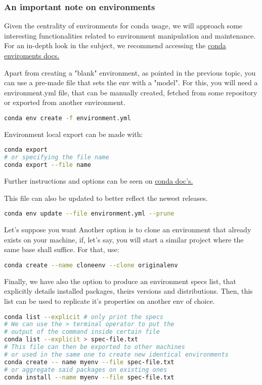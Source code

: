 \documentclass[a4paper,11pt]{article}
\begin{document}
\subsubsection{An important note on environments}
Given the centrality of environments for conda usage, we will approach some
interesting functionalities related to environment manipulation and maintenance.
For an in-depth look in the subject, we recommend accessing the
\href{https://docs.conda.io/projects/conda/en/latest/user-guide/tasks/manage-environments.html}{conda
enviroments docs.}\par
Apart from creating a "blank" environment, as pointed in the previous topic, you
can use a pre-made file that sets the env with a "model". For this, you will
need a environment.yml file, that can be manually created, fetched from some
repository or exported from another environment.
\begin{lstlisting}[language=bash]
conda env create -f environment.yml
\end{lstlisting}
\begin{tipbox}
Environment local export can be made with:
\begin{lstlisting}[language=bash]
conda export
# or specifying the file name
conda export --file name
\end{lstlisting}
Further instructions and options can be seen on
\href{https://docs.conda.io/projects/conda/en/latest/commands/env/export.html}{conda
doc's.} 
\end{tipbox}
This file can also be updated to better reflect the newest releases.
\begin{lstlisting}[language=bash]
conda env update --file environment.yml --prune
\end{lstlisting}
Let's suppose you want 
Another option is to clone an environment that already exists on your machine,
if, let's say, you will start a similar project where the same base shall
suffice. For that, use:
\begin{lstlisting}[language=bash]
conda create --name cloneenv --clone originalenv
\end{lstlisting}
Finally, we have also the option to produce an environment specs list, that
explicitly details installed packages, theirs versions and distributions. Then,
this list can be used to replicate it's properties on another env of choice.
\begin{lstlisting}[language=bash]
conda list --explicit # only print the specs
# We can use the > terminal operator to put the
# output of the command inside certain file
conda list --explicit > spec-file.txt
# This file can then be exported to other machines
# or used in the same one to create new identical environments
conda create -- name myenv --file spec-file.txt
# or aggregate said packages on existing ones
conda install --name myenv --file spec-file.txt
\end{lstlisting}
\end{document}
